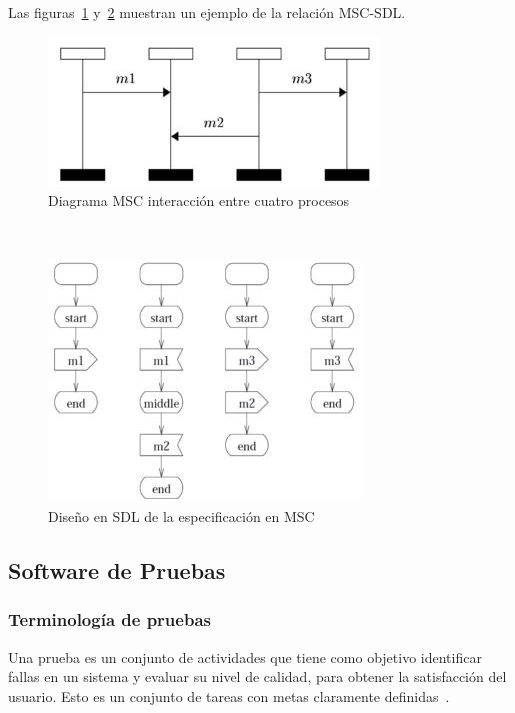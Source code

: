Las figuras~\ref{fig:DiagramaMSC} y~\ref{fig:trasl_SDL} muestran un ejemplo de la relaci\'on MSC-SDL.\\

\begin{figure}[!h]
  \centering
  \includegraphics[scale=0.7]{./images/DiagramaMSC.jpg}
  \caption{Diagrama MSC interacci\'on entre cuatro procesos}
  \label{fig:DiagramaMSC}
\end{figure}
\\
\begin{figure}[H]
  \centering
  \includegraphics[scale=0.7]{./images/trasl_SDL.jpg}
  \caption{Dise\~no en SDL de la especificaci\'on en MSC}
  \label{fig:trasl_SDL}
\end{figure}



\subsection{Software de Pruebas}
\subsubsection{Terminolog\'ia de pruebas}

Una prueba es un conjunto de actividades que tiene como objetivo identificar 
fallas en un sistema y evaluar su nivel de calidad, para obtener la 
satisfacci\'on del usuario. Esto es un conjunto de tareas con metas claramente 
definidas~\cite{Homes2013}.

